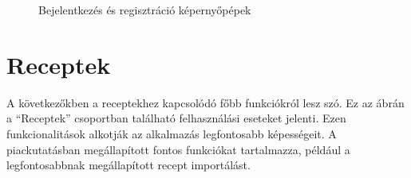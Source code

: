 \documentclass[12pt]{report}
\theoremstyle{definition}
\begin{document}
\begin{figure}[H]%
    \centering
    \qquad
    \caption{Bejelentkezés és regisztráció képernyőpépek}%
    \label{fig:loginRegis}%
\end{figure}



\section{Receptek}
A következőkben a receptekhez kapcsolódó főbb funkciókról lesz szó. Ez az ábrán a “Receptek” csoportban található felhasználási eseteket jelenti. Ezen funkcionalitások alkotják az alkalmazás legfontosabb képességeit. A piackutatásban megállapított fontos funkciókat tartalmazza, például a legfontosabbnak megállapított recept importálást.
 
\end{document}
